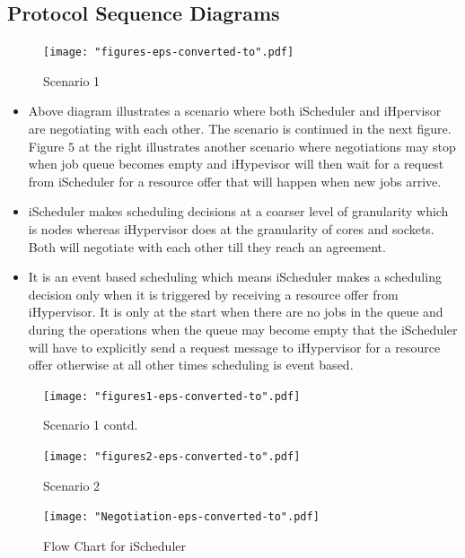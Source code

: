 \documentclass{acm_proc_article-sp}
\begin{document}
\subsection{Protocol Sequence Diagrams}
\begin{figure}[!htbp]
\centering
\texttt{[image: "figures-eps-converted-to".pdf]}
\caption{Scenario 1}
\label{fig:Seq1}
\end{figure}
\begin{itemize}
\item Above diagram illustrates a scenario where both iScheduler and iHpervisor are negotiating with each other. The scenario is continued in the next figure. Figure $5$ at the right illustrates another scenario where negotiations may stop when job queue becomes empty and iHypevisor will then wait for a request from iScheduler for a resource offer that will happen when new jobs arrive.
\item iScheduler makes scheduling decisions at a coarser level of granularity which is nodes whereas iHypervisor does at the granularity of cores and sockets. Both will negotiate with each other till they reach an agreement.
\item It is an event based scheduling which means iScheduler makes a scheduling decision only when it is triggered by receiving a resource offer from iHypervisor. It is only at the start when there are no jobs in the queue and during the operations when the queue may become empty that the iScheduler will have to explicitly send a request message to iHypervisor for a resource offer otherwise at all other times scheduling is event based.
\end{itemize}
\begin{figure}[t]
\centering
\texttt{[image: "figures1-eps-converted-to".pdf]}
\caption{Scenario 1 contd.}
\label{fig:Seq2}
\end{figure}
\begin{figure}[!htbp]
\centering
\texttt{[image: "figures2-eps-converted-to".pdf]}
\caption{Scenario 2}
\label{fig:Seq3}
\end{figure}
\begin{figure}[t]
\texttt{[image: "Negotiation-eps-converted-to".pdf]}
\caption{Flow Chart for iScheduler}
\label{fig:iScheduler}
\end{figure}
\end{document}
